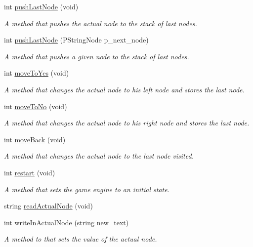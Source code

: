 \begin{DoxyCompactItemize}
int \hyperlink{classGameEngine_a0ccf9ba8728a8f4b699f95803f05089f}{push\+Last\+Node} (void)
\begin{DoxyCompactList}\small\item\em A method that pushes the actual node to the stack of last nodes. \end{DoxyCompactList}\item 
int \hyperlink{classGameEngine_a599023dd006f5f19b8793dde54806d37}{push\+Last\+Node} (P\+String\+Node p\+\_\+next\+\_\+node)
\begin{DoxyCompactList}\small\item\em A method that pushes a given node to the stack of last nodes. \end{DoxyCompactList}\item 
int \hyperlink{classGameEngine_abdba822c3e78d637d47395dc616b363e}{move\+To\+Yes} (void)
\begin{DoxyCompactList}\small\item\em A method that changes the actual node to his left node and stores the last node. \end{DoxyCompactList}\item 
int \hyperlink{classGameEngine_aef22044b8c728d648f4b0d478276c028}{move\+To\+No} (void)
\begin{DoxyCompactList}\small\item\em A method that changes the actual node to his right node and stores the last node. \end{DoxyCompactList}\item 
int \hyperlink{classGameEngine_ad5980e20974bf0f3b5adc9f1de0434ee}{move\+Back} (void)
\begin{DoxyCompactList}\small\item\em A method that changes the actual node to the last node visited. \end{DoxyCompactList}\item 
int \hyperlink{classGameEngine_ab54d6b668a506e746d432157cc611240}{restart} (void)
\begin{DoxyCompactList}\small\item\em A method that sets the game engine to an initial state. \end{DoxyCompactList}\item 
string \hyperlink{classGameEngine_ab0ccbeccb193bcade16938be6a6a388f}{read\+Actual\+Node} (void)
\item 
int \hyperlink{classGameEngine_a7c0c3494620ea427d232875ec6ac5314}{write\+In\+Actual\+Node} (string new\+\_\+text)
\begin{DoxyCompactList}\small\item\em A method to that sets the value of the actual node. \end{DoxyCompactList}\item 

\end{DoxyCompactItemize}
